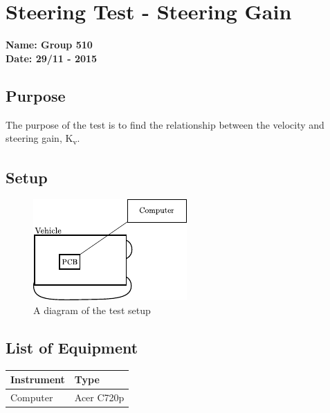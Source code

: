 \pagebreak
\section{Steering Test - Steering Gain} \label{app:steeringOrderTest}
\textbf{Name: Group 510}\\
\textbf{Date: 29/11 - 2015}

\subsection{Purpose}
The purpose of the test is to find the relationship between the velocity and steering gain, \si{K_v}.


\subsection{Setup}
\begin{figure}[H]
  \centering
	\includegraphics[scale=1.5]{figures/inertiaTestSetupDiagram2.pdf}
	\caption{A diagram of the test setup}
\end{figure}

\subsection{List of Equipment}

\begin{table}[H]
\begin{tabular}{|p{10cm}|p{4cm}|}
\hline%
  \textbf{Instrument}                     &  \textbf{Type}       \\
\hline%
  Computer                                &  Acer C720p    \\
\hline %
\end{tabular}
\end{table}

